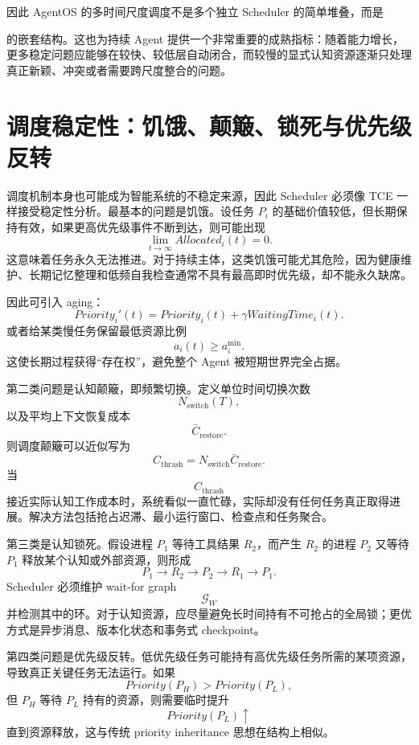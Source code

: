 因此 AgentOS 的多时间尺度调度不是多个独立 Scheduler 的简单堆叠，而是
\begin{statementbox}
\centering
{}
\end{statementbox}
的嵌套结构。这也为持续 Agent 提供一个非常重要的成熟指标：随着能力增长，更多稳定问题应能够在较快、较低层自动闭合，而较慢的显式认知资源逐渐只处理真正新颖、冲突或者需要跨尺度整合的问题。

\section{调度稳定性：饥饿、颠簸、锁死与优先级反转}

调度机制本身也可能成为智能系统的不稳定来源，因此 Scheduler 必须像 TCE 一样接受稳定性分析。最基本的问题是饥饿。设任务 $P_i$ 的基础价值较低，但长期保持有效，如果更高优先级事件不断到达，则可能出现
\[
\lim_{t\rightarrow\infty}
Allocated_i(t)=0.
\]
这意味着任务永久无法推进。对于持续主体，这类饥饿可能尤其危险，因为健康维护、长期记忆整理和低频自我检查通常不具有最高即时优先级，却不能永久缺席。

因此可引入 aging：
\[
Priority_i'(t)
=
Priority_i(t)
+
\gamma WaitingTime_i(t).
\]
或者给某类慢任务保留最低资源比例
\[
a_i(t)\geq a_i^{\min}.
\]
这使长期过程获得“存在权”，避免整个 Agent 被短期世界完全占据。

第二类问题是认知颠簸，即频繁切换。定义单位时间切换次数
\[
N_{\mathrm{switch}}(T),
\]
以及平均上下文恢复成本
\[
\bar C_{\mathrm{restore}}.
\]
则调度颠簸可以近似写为
\[
C_{\mathrm{thrash}}
=
N_{\mathrm{switch}}
\bar C_{\mathrm{restore}}.
\]
当
\[
C_{\mathrm{thrash}}
\]
接近实际认知工作成本时，系统看似一直忙碌，实际却没有任何任务真正取得进展。解决方法包括抢占迟滞、最小运行窗口、检查点和任务聚合。

第三类是认知锁死。假设进程 $P_1$ 等待工具结果 $R_2$，而产生 $R_2$ 的进程 $P_2$ 又等待 $P_1$ 释放某个认知或外部资源，则形成
\[
P_1\rightarrow R_2\rightarrow P_2\rightarrow R_1\rightarrow P_1.
\]
Scheduler 必须维护 wait-for graph
\[
\mathcal G_W
\]
并检测其中的环。对于认知资源，应尽量避免长时间持有不可抢占的全局锁；更优方式是异步消息、版本化状态和事务式 checkpoint。

第四类问题是优先级反转。低优先级任务可能持有高优先级任务所需的某项资源，导致真正关键任务无法运行。如果
\[
Priority(P_H)>Priority(P_L),
\]
但 $P_H$ 等待 $P_L$ 持有的资源，则需要临时提升
\[
Priority(P_L)\uparrow
\]
直到资源释放，这与传统 priority inheritance 思想在结构上相似。

